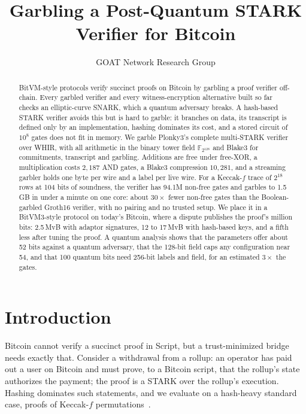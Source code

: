 \documentclass[11pt]{article}
\title{Garbling a Post-Quantum STARK Verifier for Bitcoin}
\author{GOAT Network Research Group}
\date{}
\newcommand{\F}{\mathbb{F}_{2^{128}}}
\newcommand{\AND}{\textsf{AND}}
\begin{document}
\maketitle

\begin{abstract}
BitVM-style protocols verify succinct proofs on Bitcoin by garbling a proof
verifier off-chain. Every garbled verifier and every witness-encryption
alternative built so far checks an elliptic-curve SNARK, which a quantum
adversary breaks. A hash-based STARK verifier avoids this but is hard to garble:
it branches on data, its transcript is defined only by an implementation,
hashing dominates its cost, and a stored circuit of $10^8$ gates does not fit in
memory. We garble Plonky3's complete multi-STARK verifier over WHIR, with all
arithmetic in the binary tower field $\F$ and Blake3 for commitments, transcript
and garbling. Additions are free under free-XOR, a multiplication costs
$2{,}187$ \AND{} gates, a Blake3 compression $10{,}281$, and a streaming garbler
holds one byte per wire and a label per live wire. For a Keccak-$f$ trace of
$2^{18}$ rows at 104 bits of soundness, the verifier has 94.1M non-free gates and
garbles to 1.5\,GB in under a minute on one core: about $30\times$ fewer
non-free gates than the Boolean-garbled Groth16 verifier, with no pairing and no
trusted setup. We place it in a BitVM3-style protocol on today's Bitcoin, where a
dispute publishes the proof's million bits: 2.5\,MvB with adaptor signatures,
12 to 17\,MvB with hash-based keys, and a fifth less after tuning the proof. A
quantum analysis shows that the parameters offer about 52 bits against a quantum
adversary, that the 128-bit field caps any configuration near 54, and that 100
quantum bits need 256-bit labels and field, for an estimated $3\times$ the gates.
\end{abstract}

\section{Introduction}

Bitcoin cannot verify a succinct proof in Script, but a trust-minimized bridge
needs exactly that. Consider a withdrawal from a rollup: an operator has paid
out a user on Bitcoin and must prove, to a Bitcoin script, that the rollup's
state authorizes the payment; the proof is a STARK over the rollup's execution.
Hashing dominates such statements, and we evaluate on a hash-heavy standard case,
proofs of Keccak-$f$ permutations~\cite{fips202}.
\end{document}
